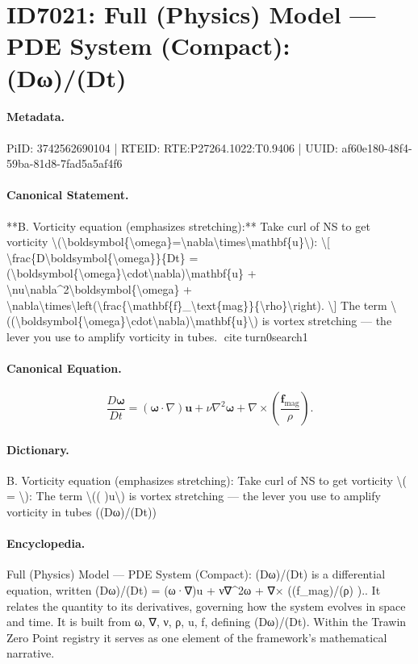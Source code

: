 \section*{ID7021: Full (Physics) Model — PDE System (Compact): (Dω)/(Dt)}
\paragraph{Metadata.}
PiID: 3742562690104 | RTEID: RTE:P27264.1022:T0.9406 | UUID: af60e180-48f4-59ba-81d8-7fad5a5af4f6

\paragraph{Canonical Statement.}
**B. Vorticity equation (emphasizes stretching):** Take curl of NS to get vorticity \textbackslash{}(\textbackslash{}boldsymbol\{\textbackslash{}omega\}=\textbackslash{}nabla\textbackslash{}times\textbackslash{}mathbf\{u\}\textbackslash{}): \textbackslash{}[ \textbackslash{}frac\{D\textbackslash{}boldsymbol\{\textbackslash{}omega\}\}\{Dt\} = (\textbackslash{}boldsymbol\{\textbackslash{}omega\}\textbackslash{}cdot\textbackslash{}nabla)\textbackslash{}mathbf\{u\} + \textbackslash{}nu\textbackslash{}nabla\textasciicircum{}2\textbackslash{}boldsymbol\{\textbackslash{}omega\} + \textbackslash{}nabla\textbackslash{}times\textbackslash{}left(\textbackslash{}frac\{\textbackslash{}mathbf\{f\}\_\textbackslash{}text\{mag\}\}\{\textbackslash{}rho\}\textbackslash{}right). \textbackslash{}] The term \textbackslash{}((\textbackslash{}boldsymbol\{\textbackslash{}omega\}\textbackslash{}cdot\textbackslash{}nabla)\textbackslash{}mathbf\{u\}\textbackslash{}) is vortex stretching — the lever you use to amplify vorticity in tubes. citeturn0search1

\paragraph{Canonical Equation.}
\[
\frac{D\boldsymbol{\omega}}{Dt} = (\boldsymbol{\omega}\cdot\nabla)\mathbf{u} + \nu\nabla^2\boldsymbol{\omega} + \nabla\times\left(\frac{\mathbf{f}_\text{mag}}{\rho}\right).
\]

\paragraph{Dictionary.}
B. Vorticity equation (emphasizes stretching): Take curl of NS to get vorticity \textbackslash{}( = \textbackslash{}): The term \textbackslash{}(( )u\textbackslash{}) is vortex stretching — the lever you use to amplify vorticity in tubes ((Dω)/(Dt))

\paragraph{Encyclopedia.}
Full (Physics) Model — PDE System (Compact): (Dω)/(Dt) is a differential equation, written (Dω)/(Dt) = (ω·∇)u + ν∇\textasciicircum{}2ω + ∇× ((f\_mag)/(ρ) ).. It relates the quantity to its derivatives, governing how the system evolves in space and time. It is built from ω, ∇, ν, ρ, u, f, defining (Dω)/(Dt). Within the Trawin Zero Point registry it serves as one element of the framework's mathematical narrative.
